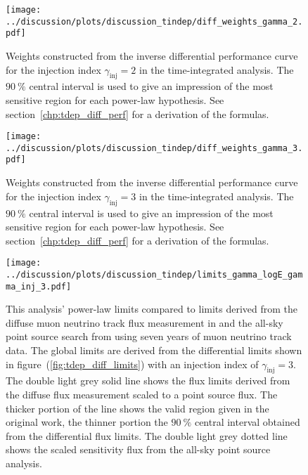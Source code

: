 \begin{figure}[H]
  \centering
  \texttt{[image: ../discussion/plots/discussion\_tindep/diff\_weights\_gamma\_2.pdf]}
  \caption[Differential performance weights for $\gamma_\text{inj}=2$]{
    Weights constructed from the inverse differential performance curve for the injection index $\gamma_\text{inj}=2$ in the time-integrated analysis.
    The $\SI{90}{\percent}$ central interval is used to give an impression of the most sensitive region for each power-law hypothesis.
    See section~\ref{chp:tdep_diff_perf} for a derivation of the formulas.
  }
  \label{fig:tindep_diff_weights_gamma_2}
\end{figure}
\enlargethispage*{5cm}
\begin{figure}[H]
  \centering
  \texttt{[image: ../discussion/plots/discussion\_tindep/diff\_weights\_gamma\_3.pdf]}
  \caption[Differential performance weights for $\gamma_\text{inj}=3$]{
    Weights constructed from the inverse differential performance curve for the injection index $\gamma_\text{inj}=3$ in the time-integrated analysis.
    The $\SI{90}{\percent}$ central interval is used to give an impression of the most sensitive region for each power-law hypothesis.
    See section~\ref{chp:tdep_diff_perf} for a derivation of the formulas.
  }
  \label{fig:tindep_diff_weights_gamma_3}
\end{figure}

\begin{figure}[H]
  \centering
  \texttt{[image: ../discussion/plots/discussion\_tindep/limits\_gamma\_logE\_gamma\_inj\_3.pdf]}
  \caption[Time-integrated analysis global power-law limits]{
    This analysis' power-law limits compared to limits derived from the diffuse muon neutrino track flux measurement in \cite{Haack:2017dxi} and the all-sky point source search from \cite{Aartsen:2016oji} using seven years of muon neutrino track data.
    The global limits are derived from the differential limits shown in figure~(\ref{fig:tdep_diff_limits}) with an injection index of $\gamma_\text{inj}=3$.
    The double light grey solid line shows the flux limits derived from the diffuse flux measurement scaled to a point source flux.
    The thicker portion of the line shows the valid region given in the original work, the thinner portion the $\SI{90}{\percent}$ central interval obtained from the differential flux limits.
    The double light grey dotted line shows the scaled sensitivity flux from the all-sky point source analysis.
  }
  \label{fig:tdep_limits_gamma_logE_gamma_inj_3}
\end{figure}
